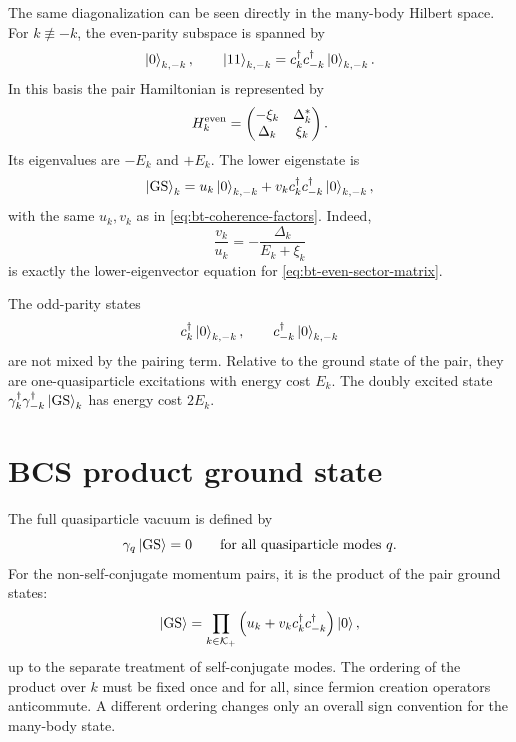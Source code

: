 The same diagonalization can be seen directly in the many-body Hilbert space.
For $k\not\equiv -k$, the even-parity subspace is spanned by
\begin{equation}
\label{eq:bt-even-basis}
    \left|0\right\rangle_{k,-k},
    \qquad
    \left|11\right\rangle_{k,-k}=c_k^\dagger c_{-k}^\dagger\left|0\right\rangle_{k,-k}.
\end{equation}
In this basis the pair Hamiltonian is represented by
\begin{equation}
\label{eq:bt-even-sector-matrix}
    H_k^{\rm even}
    =
    \begin{pmatrix}
        -\xi_k&\Delta_k^*\\
        \Delta_k&\xi_k
    \end{pmatrix}.
\end{equation}
Its eigenvalues are $-E_k$ and $+E_k$.  The lower eigenstate is
\begin{equation}
\label{eq:bt-pair-ground-state}
    \left|\mathrm{GS}\right\rangle_k
    =
    u_k\left|0\right\rangle_{k,-k}
    +v_k c_k^\dagger c_{-k}^\dagger\left|0\right\rangle_{k,-k},
\end{equation}
with the same $u_k,v_k$ as in \cref{eq:bt-coherence-factors}.  Indeed,
\begin{equation}
    \frac{v_k}{u_k}=-\frac{\Delta_k}{E_k+\xi_k}
\end{equation}
is exactly the lower-eigenvector equation for
\cref{eq:bt-even-sector-matrix}.

The odd-parity states
\begin{equation}
    c_k^\dagger\left|0\right\rangle_{k,-k},
    \qquad
    c_{-k}^\dagger\left|0\right\rangle_{k,-k}
\end{equation}
are not mixed by the pairing term.  Relative to the ground state of the pair,
they are one-quasiparticle excitations with energy cost $E_k$.  The doubly
excited state $\gamma_k^\dagger\gamma_{-k}^\dagger\left|\mathrm{GS}\right\rangle_k$ has energy
cost $2E_k$.

\section{BCS product ground state}
\label{sec:bt-bcs-product-ground-state}

The full quasiparticle vacuum is defined by
\begin{equation}
\label{eq:bt-quasiparticle-vacuum-definition}
    \gamma_q\left|\mathrm{GS}\right\rangle=0
    \qquad
    \text{for all quasiparticle modes }q.
\end{equation}
For the non-self-conjugate momentum pairs, it is the product of the pair ground
states:
\begin{equation}
\label{eq:bt-bcs-product-state}
    \left|\mathrm{GS}\right\rangle
    =
    \prod_{k\in\mathcal{K}_+}
    \left(
        u_k+v_k c_k^\dagger c_{-k}^\dagger
    \right)
    \left|0\right\rangle,
\end{equation}
up to the separate treatment of self-conjugate modes.  The ordering of the
product over $k$ must be fixed once and for all, since fermion creation operators
anticommute.  A different ordering changes only an overall sign convention for
the many-body state.

